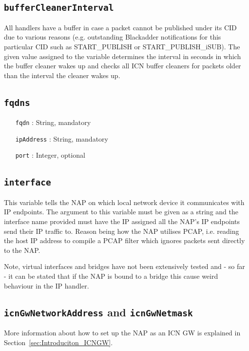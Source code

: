 \documentclass[a4paper,11pt,titlepage]{report}
\begin{document}
\subsection{\texttt{bufferCleanerInterval}}\label{sec:Introduction_Var_BufferCleanerInterval}
All handlers have a buffer in case a packet cannot be published under its \ac{CID} due to various reasons (e.g. outstanding Blackadder notifications for this particular \ac{CID} such as START\_PUBLISH or START\_PUBLISH\_iSUB). The given value assigned to the variable determines the interval in seconds in which the buffer cleaner wakes up and checks all \ac{ICN} buffer cleaners for packets older than the interval the cleaner wakes up.

\subsection{\texttt{fqdns}}
\begin{itemize}
	\item[\texttt{fqdn}]: String, mandatory
	\item[\texttt{ipAddress}]: String, mandatory
	\item[\texttt{port}]: Integer, optional
\end{itemize}

\subsection{\texttt{interface}}\label{sec:Introduction_Var_interface}
This variable tells the \ac{NAP} on which local network device it communicates with IP endpoints. The argument to this variable must be given as a string and the interface name provided must have the IP assigned all the NAP's IP endpoints send their IP traffic to. Reason being how the NAP utilises PCAP, i.e. reading the host IP address to compile a PCAP filter which ignores packets sent directly to the NAP.

Note, virtual interfaces and bridges have not been extensively tested and - so far - it can be stated that if the NAP is bound to a bridge this cause weird behaviour in the IP handler.

\subsection{\texttt{icnGwNetworkAddress} and \texttt{icnGwNetmask}}\label{sec:Introduction_Var_icnGw}
More information about how to set up the \ac{NAP} as an ICN \ac{GW} is explained in Section~\ref{sec:Introduciton_ICNGW}.
\end{document}
